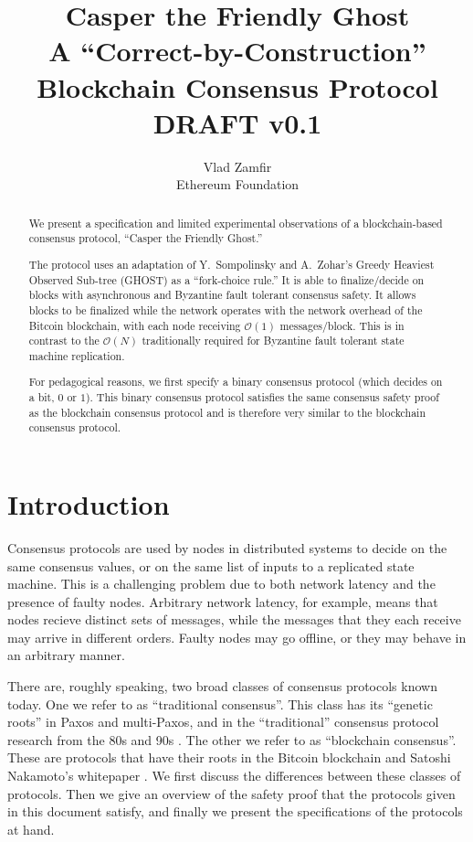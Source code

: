 \documentclass{article}
\theoremstyle{definition}
\begin{document}
\title{ Casper the Friendly Ghost \\ \Large{A ``Correct-by-Construction'' Blockchain Consensus Protocol} \\ \vspace{5mm} \small{DRAFT v0.1}}
\author{Vlad Zamfir \\ Ethereum Foundation}
\maketitle

\begin{abstract}
We present a specification and limited experimental observations of a blockchain-based consensus protocol, ``Casper the Friendly Ghost.''

The protocol uses an adaptation of Y.\ Sompolinsky and A.\ Zohar's Greedy Heaviest Observed Sub-tree (GHOST) \cite{GHOST} as a ``fork-choice rule.'' It is able to finalize/decide on blocks with asynchronous and Byzantine fault tolerant consensus safety. It allows blocks to be finalized while the network operates with the network overhead of the Bitcoin blockchain, with each node receiving $\mathcal{O}(1)$ messages/block. This is in contrast to the $\mathcal{O}(N)$ traditionally required for Byzantine fault tolerant state machine replication.

For pedagogical reasons, we first specify a binary consensus protocol (which decides on a bit, $0$ or $1$). This binary consensus protocol satisfies the same consensus safety proof as the blockchain consensus protocol and is therefore very similar to the blockchain consensus protocol.

\end{abstract}

\section{Introduction}

Consensus protocols are used by nodes in distributed systems to decide on the same consensus values, or on the same list of inputs to a replicated state machine. This is a challenging problem due to both network latency and the presence of faulty nodes. Arbitrary network latency, for example, means that nodes recieve distinct sets of messages, while the messages that they each receive may arrive in different orders. Faulty nodes may go offline, or they may behave in an arbitrary manner.

There are, roughly speaking, two broad classes of consensus protocols known today. One we refer to as ``traditional consensus''. This class has its ``genetic roots'' in Paxos and multi-Paxos, and in the ``traditional'' consensus protocol research from the 80s and 90s \cite{lamport_1998}. The other we refer to as ``blockchain consensus''. These are protocols that have their roots in the Bitcoin blockchain and Satoshi Nakamoto's whitepaper \cite{nakamoto}. We first discuss the differences between these classes of protocols. Then we give an overview of the safety proof that the protocols given in this document satisfy, and finally we present the specifications of the protocols at hand.
\end{document}
